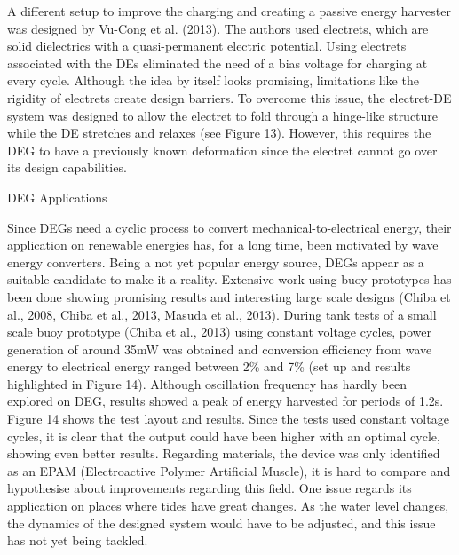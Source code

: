 	A different setup to improve the charging and creating a passive energy harvester was designed by Vu-Cong et al. (2013). The authors used electrets, which are solid dielectrics with a quasi-permanent electric potential. Using electrets associated with the DEs eliminated the need of a bias voltage for charging at every cycle. Although the idea by itself looks promising, limitations like the rigidity of electrets create design barriers. To overcome this issue, the electret-DE system was designed to allow the electret to fold through a hinge-like structure while the DE stretches and relaxes (see Figure 13). However, this requires the DEG to have a previously known deformation since the electret cannot go over its design capabilities.

DEG Applications

Since DEGs need a cyclic process to convert mechanical-to-electrical energy, their application on renewable energies has, for a long time, been motivated by wave energy converters. Being a not yet popular energy source, DEGs appear as a suitable candidate to make it a reality. Extensive work using buoy prototypes has been done showing promising results and interesting large scale designs (Chiba et al., 2008, Chiba et al., 2013, Masuda et al., 2013). During tank tests of a small scale buoy prototype (Chiba et al., 2013) using constant voltage cycles, power generation of around 35mW was obtained and conversion efficiency from wave energy to electrical energy ranged between 2\% and 7\% (set up and results highlighted in Figure 14). Although oscillation frequency has hardly been explored on DEG, results showed a peak of energy harvested for periods of 1.2s. Figure 14 shows the test layout and results. Since the tests used constant voltage cycles, it is clear that the output could have been higher with an optimal cycle, showing even better results. Regarding materials, the device was only identified as an EPAM (Electroactive Polymer Artificial Muscle), it is hard to compare and hypothesise about improvements regarding this field. One issue regards its application on places where tides have great changes. As the water level changes, the dynamics of the designed system would have to be adjusted, and this issue has not yet being tackled. 

 


